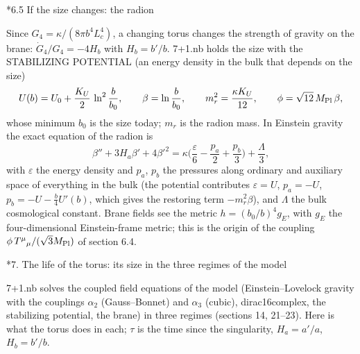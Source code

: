\documentclass[10pt,a4paper]{article}
\makeatletter
\renewcommand\section{\@startsection{section}{1}{\z@}{-3.5ex \@plus -1ex \@minus -.2ex}{2.3ex \@plus.2ex}{\normalfont\Large\bfseries\raggedright}}
\renewcommand\subsection{\@startsection{subsection}{2}{\z@}{-3.25ex\@plus -1ex \@minus -.2ex}{1.5ex \@plus .2ex}{\normalfont\large\bfseries\raggedright}}
\makeatother
\begin{document}
\subsection*{6.5 If the size changes: the radion}
Since $G_4=\kappa/(8\pi b^4L_c^4)$, a changing torus changes the strength of gravity on the brane: $\dot G_4/G_4=-4H_b$ with $H_b=b'/b$. 7+1.nb holds the size with the STABILIZING POTENTIAL (an energy density in the bulk that depends on the size)
\begin{equation*}
U(b)=U_0+\frac{K_U}2\,\ln^2\frac b{b_0},\qquad \beta=\ln\frac b{b_0},\qquad m_r^2=\frac{\kappa K_U}{12},\qquad \phi=\sqrt{12}\,M_{\rm Pl}\,\beta,
\end{equation*}
whose minimum $b_0$ is the size today; $m_r$ is the radion mass. In Einstein gravity the exact equation of the radion is
\begin{equation*}
\beta''+3H_a\beta'+4\beta'^2=\kappa\Big(\frac\varepsilon6-\frac{p_a}2+\frac{p_b}3\Big)+\frac\Lambda3,
\end{equation*}
with $\varepsilon$ the energy density and $p_a$, $p_b$ the pressures along ordinary and auxiliary space of everything in the bulk (the potential contributes $\varepsilon=U$, $p_a=-U$, $p_b=-U-\frac b4U'(b)$, which gives the restoring term $-m_r^2\beta$), and $\Lambda$ the bulk cosmological constant. Brane fields see the metric $h=(b_0/b)^4g_E$, with $g_E$ the four-dimensional Einstein-frame metric; this is the origin of the coupling $\phi\,T^\mu{}_\mu/(\sqrt3M_{\rm Pl})$ of section 6.4.

\section*{7. The life of the torus: its size in the three regimes of the model}
7+1.nb solves the coupled field equations of the model (Einstein–Lovelock gravity with the couplings $\alpha_2$ (Gauss–Bonnet) and $\alpha_3$ (cubic), dirac16complex, the stabilizing potential, the brane) in three regimes (sections 14, 21–23). Here is what the torus does in each; $\tau$ is the time since the singularity, $H_a=a'/a$, $H_b=b'/b$.
\end{document}
